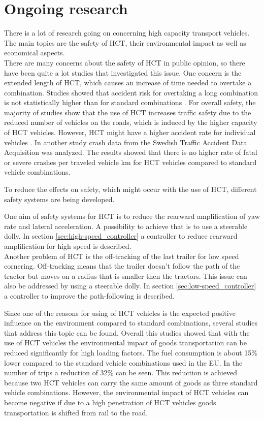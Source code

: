 \documentclass[ExampleMasters.tex]{subfiles}
\begin{document}
\section{Ongoing research}
\label{sec:ongoing_research}
There is a lot of research going on concerning high capacity transport vehicles. The main topics are the safety of \gls{HCT}, their environmental impact as well as economical aspects.\\

There are many concerns about the safety of \gls{HCT} in public opinion, so there have been quite a lot studies that investigated this issue. One concern is the extended length of \gls{HCT}, which causes an increase of time needed to overtake a combination. Studies showed that accident risk for overtaking a long combination is not statistically higher than for standard combinations \cite{EMS}.
For overall safety, the majority of studies show that the use of \gls{HCT} increases traffic safety due to the reduced number of vehicles on the roads, which is induced by the higher capacity of \gls{HCT} vehicles. However, \gls{HCT} might have a higher accident rate for individual vehicles \cite{EMS}. In another study crash data from the Swedish Traffic Accident Data Acquisition was analyzed. The results showed that there is no higher rate of fatal or severe crashes per traveled vehicle km for \gls{HCT} vehicles compared to standard vehicle combinations. \cite{balint2013correlation}

To reduce the effects on safety, which might occur with the use of \gls{HCT}, different safety systems are being developed.

One aim of safety systems for \gls{HCT} is to reduce the rearward amplification of yaw rate and lateral acceleration. A possibility to achieve that is to use a steerable dolly. In section \ref{sec:high-speed_controller} a controller to reduce rearward amplification for high speed is described.\\
Another problem of \gls{HCT} is the off-tracking of the last trailer for low speed cornering. Off-tracking means that the trailer doesn't follow the path of the tractor but moves on a radius that is smaller then the tractors. This issue can also be addressed by using a steerable dolly. In section \ref{sec:low-speed_controller} a controller to improve the path-following is described.

Since one of the reasons for using of \gls{HCT} vehicles is the expected positive influence on the environment compared to standard combinations, several studies that address this topic can be found.   
Overall this studies showed that with the use of \gls{HCT} vehicles the environmental impact of goods transportation can be reduced significantly for high loading factors. The fuel consumption is about 15\% lower compared to the standard vehicle combinations used in the EU. In the number of trips a reduction of 32\% can be seen. This reduction is achieved because two \gls{HCT} vehicles can carry the same amount of goods as three standard vehicle combinations.  \cite{backman2002improved}
However, the environmental impact of \gls{HCT} vehicles can become negative if due to a high penetration of \gls{HCT} vehicles goods transportation is shifted from rail to the road. \cite{doll2009long}
\end{document}
